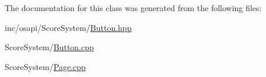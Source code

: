 The documentation for this class was generated from the following files\+:\begin{DoxyCompactItemize}
\item 
inc/osapi/\+Score\+System/\hyperlink{_button_8hpp}{Button.\+hpp}\item 
Score\+System/\hyperlink{_button_8cpp}{Button.\+cpp}\item 
Score\+System/\hyperlink{_page_8cpp}{Page.\+cpp}\end{DoxyCompactItemize}
